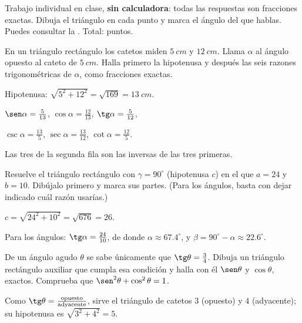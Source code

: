\documentclass[11pt]{article}
\begin{document}
\encabezado

\begin{instrucciones}
Trabajo individual en clase, \textbf{sin calculadora}: todas las respuestas son fracciones
exactas. Dibuja el triángulo en cada punto y marca el ángulo del que hablas. Puedes consultar
la . Total: \totalpuntos{} puntos.
\end{instrucciones}

\begin{preguntas}

\pregunta[1.5] En un triángulo rectángulo los catetos miden $\qty{5}{cm}$ y $\qty{12}{cm}$.
Llama $\alpha$ al ángulo opuesto al cateto de $\qty{5}{cm}$. Halla primero la hipotenusa y
después las seis razones trigonométricas de $\alpha$, como fracciones exactas.
\begin{solucion}[5.5cm]
Hipotenusa: $\sqrt{5^2 + 12^2} = \sqrt{169} = \qty{13}{cm}$.

$\sen \alpha = \frac{5}{13}$, \quad $\cos \alpha = \frac{12}{13}$, \quad
$\tg \alpha = \frac{5}{12}$,

$\csc \alpha = \frac{13}{5}$, \quad $\sec \alpha = \frac{13}{12}$, \quad
$\cot \alpha = \frac{12}{5}$.

Las tres de la segunda fila son las inversas de las tres primeras.
\end{solucion}

\pregunta[1] Resuelve el triángulo rectángulo con $\gamma = 90^\circ$ (hipotenusa $c$) en el
que $a = 24$ y $b = 10$. Dibújalo primero y marca sus partes. (Para los ángulos, basta con
dejar indicado cuál razón usarías.)
\begin{solucion}[4.5cm]
$c = \sqrt{24^2 + 10^2} = \sqrt{676} = 26$.

Para los ángulos: $\tg \alpha = \frac{24}{10}$, de donde $\alpha \approx \num{67,4}^\circ$, y
$\beta = 90^\circ - \alpha \approx \num{22,6}^\circ$.
\end{solucion}

\pregunta[1.5] De un ángulo agudo $\theta$ se sabe únicamente que $\tg \theta = \frac{3}{4}$.
Dibuja un triángulo rectángulo auxiliar que cumpla esa condición y halla con él
$\sen \theta$ y $\cos \theta$, exactos. Comprueba que
$\sen^2 \theta + \cos^2 \theta = 1$.
\begin{solucion}[5.5cm]
Como $\tg \theta = \frac{\text{opuesto}}{\text{adyacente}}$, sirve el triángulo de catetos $3$
(opuesto) y $4$ (adyacente); su hipotenusa es $\sqrt{3^2 + 4^2} = 5$.


\end{solucion}
\end{preguntas}
\end{document}
